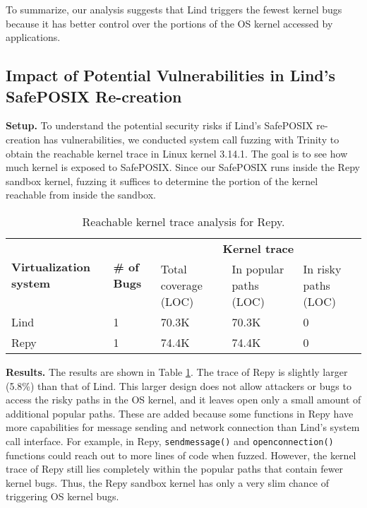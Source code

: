 {{{To summarize, our analysis suggests that Lind triggers the fewest kernel bugs because
it has better control over the portions of the OS kernel accessed by applications.

\subsection{Impact of Potential Vulnerabilities in Lind's SafePOSIX Re-creation}
\label{Reachable-Kernel-Trace-Analysis-for-Repy-Sandbox}


\noindent
\textbf{Setup.}
To understand the potential security risks if Lind's SafePOSIX re-creation
has vulnerabilities, we conducted system call fuzzing with Trinity
to obtain the reachable kernel trace in Linux kernel 3.14.1.
The goal is to see how much kernel is exposed to
SafePOSIX. Since our SafePOSIX runs inside the Repy sandbox kernel,
fuzzing it suffices to determine the portion of the kernel reachable from
inside the sandbox.

\begin{table}
\centering
\scriptsize
\begin{tabular}{|l|l|l|l|l|}
  \hline
  \multirow{3}{1.5cm}{\bf Virtualization system} & \multirow{3}{0.5cm}{\bf \# of Bugs} & \multicolumn{3}{c|}{\bf Kernel trace} \\ \cline{3-5}
  & & \multirow{2}{1.5cm}{Total coverage (LOC)} & \multirow{2}{1.3cm}{In popular paths (LOC)} & \multirow{2}{1.3cm}{In risky paths (LOC)}  \\
  & & & & \\  \hline
  Lind & 1 & 70.3K & 70.3K & 0 \\
  \hline
  Repy & 1 & 74.4K & 74.4K & 0 \\
  \hline
\end{tabular}\caption{\small Reachable kernel trace analysis for Repy.}
\label{table:trace-Repy}
\end{table}

\noindent
\textbf{Results.}
The results are shown in Table \ref{table:trace-Repy}.
The trace of Repy is slightly larger (5.8\%) than that of Lind.
This larger design does not allow attackers or bugs to
access the risky paths in the OS kernel, and it leaves open only a small amount of
additional popular paths. These are added because some functions in Repy
have more capabilities for message sending and network connection than Lind's
system call interface.
For example, in Repy,
\texttt{sendmessage()} and \texttt{openconnection()}
functions could reach out to more lines of code when fuzzed. However, the kernel
trace of Repy still lies completely within the popular paths that
contain fewer kernel bugs. Thus, the Repy sandbox kernel
has only a very slim chance of triggering OS kernel bugs.

}}}
